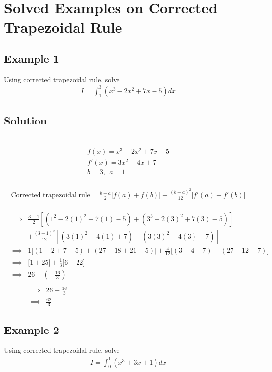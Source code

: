 \documentclass[12pt]{report}
\newcommand{\sps}{\\[0.2cm]}
\newcommand{\spn}[1]{\\[#1cm]}
\newcommand{\sprime}{'}
\begin{document}
	
	
	\section{Solved Examples on Corrected Trapezoidal Rule}
	\subsection{Example 1}
	Using corrected trapezoidal rule, solve
	\begin{eqnarray*}
		I = \int_1^3\left(x^3 - 2x^2 + 7x - 5\right)dx
	\end{eqnarray*}
	
	\subsection*{Solution}
	{~}\\[-2.1cm]
	\begin{gather*}
		f(x) = x^3 - 2x^2 + 7x - 5\sps
		f\sprime(x) = 3x^2 - 4x + 7\sps
		b=3,~~ a=1
	\end{gather*}
	{~}\\[-2.1cm]
	\begin{gather*}
		\text{Corrected trapezoidal rule} = \frac{b-a}{2}\Big[f(a) + f(b)\Big] + \frac{(b-a)^2}{12}\Big[f\sprime(a)-f\sprime(b)\Big]
	\end{gather*}
	{~}\\[-1.5cm]
	\begin{eqnarray*}
		&\implies&\frac{3-1}{2}\left[(1^2-2(1)^2 + 7(1) - 5) + (3^3 - 2(3)^2 + 7(3) - 5)\right]\sps
		&& +\frac{(3-1)^2}{12}\left[(3(1)^2 - 4(1) + 7) - (3(3)^2 - 4(3) + 7)\right]\spn{0.4}
		&\implies& 1\Big[(1-2+7-5) + (27-18+21-5)\Big] + \frac{4}{12}\Big[(3-4+7)- (27-12+7)\Big]\spn{0.4}
		&\implies&\Big[1+25\Big]+ \frac{1}{3}\Big[6-22\Big]\spn{0.4}
		&\implies& 26 + \left(-\frac{16}{3}\right)\spn{0.4}
	\end{eqnarray*}
	\begin{eqnarray*}
		&\implies& 26 - \frac{16}{3}\hspace{10cm}\spn{0.4}
		&\implies& \frac{62}{3}
	\end{eqnarray*}
	
	
		\subsection{Example 2}
	Using corrected trapezoidal rule, solve
	\begin{eqnarray*}
		I = \int_0^1\left(x^3 +3x + 1\right)dx
	\end{eqnarray*}
	
\end{document}
